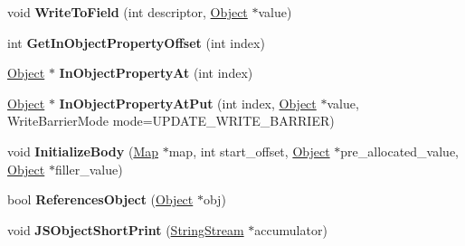 \begin{DoxyCompactItemize}
\item 
void {\bfseries Write\+To\+Field} (int descriptor, \hyperlink{classv8_1_1internal_1_1_object}{Object} $\ast$value)\hypertarget{classv8_1_1internal_1_1_j_s_object_ae94ac8e9385323133ebed0f8810254ea}{}\label{classv8_1_1internal_1_1_j_s_object_ae94ac8e9385323133ebed0f8810254ea}

\item 
int {\bfseries Get\+In\+Object\+Property\+Offset} (int index)\hypertarget{classv8_1_1internal_1_1_j_s_object_a4f8ffe19e26ca55d11efe84d24e08c13}{}\label{classv8_1_1internal_1_1_j_s_object_a4f8ffe19e26ca55d11efe84d24e08c13}

\item 
\hyperlink{classv8_1_1internal_1_1_object}{Object} $\ast$ {\bfseries In\+Object\+Property\+At} (int index)\hypertarget{classv8_1_1internal_1_1_j_s_object_a2780a1cf5386b77bd61264ea2831bbb1}{}\label{classv8_1_1internal_1_1_j_s_object_a2780a1cf5386b77bd61264ea2831bbb1}

\item 
\hyperlink{classv8_1_1internal_1_1_object}{Object} $\ast$ {\bfseries In\+Object\+Property\+At\+Put} (int index, \hyperlink{classv8_1_1internal_1_1_object}{Object} $\ast$value, Write\+Barrier\+Mode mode=U\+P\+D\+A\+T\+E\+\_\+\+W\+R\+I\+T\+E\+\_\+\+B\+A\+R\+R\+I\+ER)\hypertarget{classv8_1_1internal_1_1_j_s_object_a0b2a8eedcdcfd224ad0fb511381fbe4d}{}\label{classv8_1_1internal_1_1_j_s_object_a0b2a8eedcdcfd224ad0fb511381fbe4d}

\item 
void {\bfseries Initialize\+Body} (\hyperlink{classv8_1_1internal_1_1_map}{Map} $\ast$map, int start\+\_\+offset, \hyperlink{classv8_1_1internal_1_1_object}{Object} $\ast$pre\+\_\+allocated\+\_\+value, \hyperlink{classv8_1_1internal_1_1_object}{Object} $\ast$filler\+\_\+value)\hypertarget{classv8_1_1internal_1_1_j_s_object_a57dac3f9cbec6e47750861590736a394}{}\label{classv8_1_1internal_1_1_j_s_object_a57dac3f9cbec6e47750861590736a394}

\item 
bool {\bfseries References\+Object} (\hyperlink{classv8_1_1internal_1_1_object}{Object} $\ast$obj)\hypertarget{classv8_1_1internal_1_1_j_s_object_a7055378a4956dab348a946e35ab9bf9b}{}\label{classv8_1_1internal_1_1_j_s_object_a7055378a4956dab348a946e35ab9bf9b}

\item 
void {\bfseries J\+S\+Object\+Short\+Print} (\hyperlink{classv8_1_1internal_1_1_string_stream}{String\+Stream} $\ast$accumulator)\hypertarget{classv8_1_1internal_1_1_j_s_object_a462b6fa796709b5af86864e5f67527a8}{}\label{classv8_1_1internal_1_1_j_s_object_a462b6fa796709b5af86864e5f67527a8}


\end{DoxyCompactItemize}

